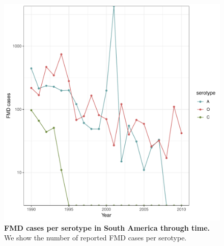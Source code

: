\documentclass[a4paper,10pt]{article}
\begin{document}
\newpage
\begin{center}
\begin{figure}[H]
\begin{center}
\includegraphics[scale=.600]{FIGURES/PLOTS/cases_per_serotype_per_time.pdf}
\end{center}
\caption{
\textbf{FMD cases per serotype in South America through time.}
We show the number of reported FMD cases per serotype.
}
\label{sfig:case_temporal}
\end{figure}
\end{center}
\end{document}
